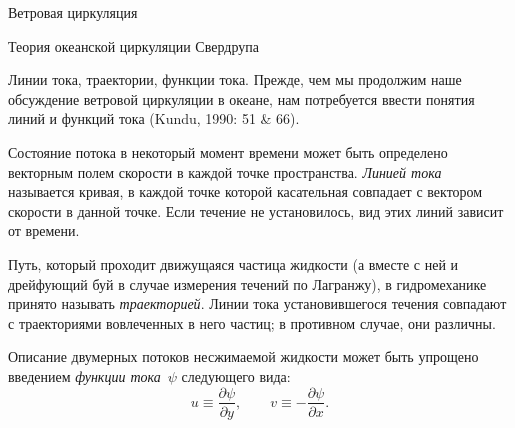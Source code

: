 \begin{chapter}{Ветровая циркуляция}
\begin{section}{Теория океанской циркуляции Свердрупа}
\begin{paragraph}{Линии тока, траектории, функции тока.}
Прежде, чем мы продолжим наше обсуждение ветровой циркуляции в океане,
нам потребуется ввести понятия линий и функций тока
(Kundu, 1990: 51 \& 66).
%

Состояние потока в некоторый момент времени может быть определено векторным
полем скорости в каждой точке пространства. 
\emph{Линией тока} называется кривая, в каждой
точке которой касательная совпадает с вектором скорости в данной точке.
Если течение не установилось, вид этих линий зависит от времени.
%

Путь, который проходит движущаяся частица жидкости (а вместе с ней и
дрейфующий буй в случае измерения течений по Лагранжу), в гидромеханике
принято называть \emph{траекторией}.
Линии тока установившегося течения совпадают с траекториями вовлеченных 
в него частиц; в противном случае, они различны.
%

Описание двумерных потоков несжимаемой жидкости может быть упрощено
введением \emph{функции тока}~$\psi$ 
следующего вида:
\begin{equation}\label{eq:11.11}
 u \equiv \frac{\partial{\psi}}{\partial{y}}, \qquad
 v \equiv -\frac{\partial{\psi}}{\partial{x}}.
\end{equation}
%


\end{paragraph}
\end{section}
\end{chapter}
